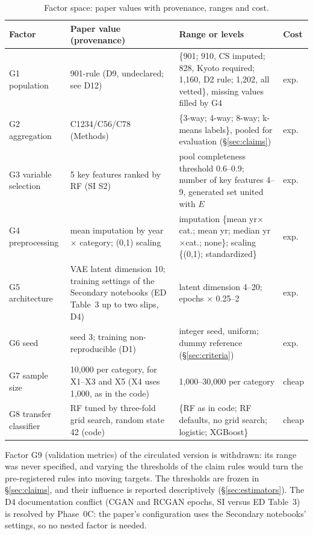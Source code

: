\documentclass[11pt,a4paper]{article}
\newcommand{\prop}[1]{#1}
\newcommand{\prop}[1]{\textcolor{blue}{#1}}
\begin{document}
\begin{table}[H]
\caption{Factor space: paper values with provenance, ranges and cost.}
\label{tab:factors}
\footnotesize
\begin{tabularx}{\textwidth}{@{}l Y Y l@{}}
\toprule
Factor & Paper value (provenance) & Range or levels & Cost\\
\midrule
G1 population & \prop{901-rule (D9, undeclared; see D12)} &
  \prop{\{901; 910, CS imputed; 828, Kyoto required; 1{,}160, D2 rule;
  1{,}202, all vetted\}, missing values filled by G4} & exp.\\
G2 aggregation & C1234/C56/C78 (Methods) &
  \{3-way; 4-way; 8-way; k-means labels\}\prop{, pooled for evaluation
  (\S\ref{sec:claims})} & exp.\\
G3 variable selection & 5 key features ranked by RF (SI S2) &
  pool completeness threshold 0.6--0.9; number of key features 4--9\prop{,
  generated set united with $E$} & exp.\\
G4 preprocessing & mean imputation by year $\times$ category; (0,1)
  scaling & imputation \{mean yr$\times$cat.; mean yr; median
  yr$\times$cat.; none\}; scaling \{(0,1); standardized\} & exp.\\
G5 architecture & VAE latent dimension 10; \prop{training settings of the
  Secondary notebooks (ED Table~3 up to two slips, D4)} & latent dimension
  4--20; epochs $\times$ 0.25--2 & exp.\\
G6 seed & seed 3; training non-reproducible (D1) & \prop{integer seed,
  uniform; dummy reference (\S\ref{sec:criteria})} & exp.\\
G7 sample size & 10{,}000 per category\prop{, for X1--X3 and X5 (X4
  uses 1{,}000, as in the code)} & 1{,}000--30{,}000 per category & cheap\\
G8 transfer classifier & RF \prop{tuned by three-fold grid search, random
  state 42} (code) & \{RF as in code; RF defaults\prop{, no grid search};
  logistic; XGBoost\} & cheap\\
\bottomrule
\end{tabularx}
\end{table}

\noindent \prop{Factor G9 (validation metrics) of the circulated version is
withdrawn: its range was never specified, and varying the thresholds of
the claim rules would turn the pre-registered rules into moving targets.
The thresholds are frozen in \S\ref{sec:claims}, and their influence is
reported descriptively (\S\ref{sec:estimators}).} \prop{The D4 documentation conflict (CGAN and RCGAN epochs, SI versus ED
Table~3) is resolved by Phase~0C: the paper's configuration uses the
Secondary notebooks' settings, so no nested factor is needed.}
\end{document}
